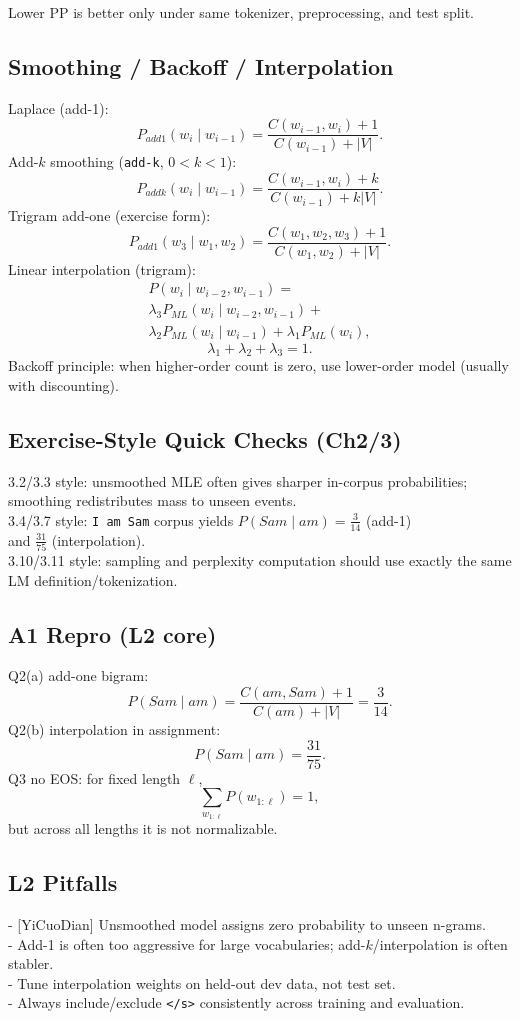 Lower PP is better only under same tokenizer, preprocessing, and test split.

\subsection*{Smoothing / Backoff / Interpolation}
Laplace (add-1):
\[
P_{add1}(w_i\mid w_{i-1})=
\frac{C(w_{i-1},w_i)+1}{C(w_{i-1})+|V|}.
\]
Add-$k$ smoothing (\texttt{add-k}, $0<k<1$):
\[
P_{addk}(w_i\mid w_{i-1})=
\frac{C(w_{i-1},w_i)+k}{C(w_{i-1})+k|V|}.
\]
Trigram add-one (exercise form):
\[
P_{add1}(w_3\mid w_1,w_2)=
\frac{C(w_1,w_2,w_3)+1}{C(w_1,w_2)+|V|}.
\]
Linear interpolation (trigram):
\[
\begin{array}{l}
P(w_i\mid w_{i-2},w_{i-1})=\\
\lambda_3P_{ML}(w_i\mid w_{i-2},w_{i-1})+\\
\lambda_2P_{ML}(w_i\mid w_{i-1})+\lambda_1P_{ML}(w_i),
\end{array}
\]
\[
\lambda_1+\lambda_2+\lambda_3=1.
\]
Backoff principle: when higher-order count is zero, use lower-order model (usually with discounting).

\subsection*{Exercise-Style Quick Checks (Ch2/3)}
3.2/3.3 style: unsmoothed MLE often gives sharper in-corpus probabilities;\\
smoothing redistributes mass to unseen events.\\
3.4/3.7 style: \texttt{I am Sam} corpus yields $P(Sam\mid am)=\frac{3}{14}$ (add-1)\\
and $\frac{31}{75}$ (interpolation).\\
3.10/3.11 style: sampling and perplexity computation should use exactly the same LM definition/tokenization.

\subsection*{A1 Repro (L2 core)}
Q2(a) add-one bigram:
\[
P(Sam\mid am)=\frac{C(am,Sam)+1}{C(am)+|V|}=\frac{3}{14}.
\]
Q2(b) interpolation in assignment:
\[
P(Sam\mid am)=\frac{31}{75}.
\]
Q3 no EOS: for fixed length $\ell$,
\[
\sum_{w_{1:\ell}}P(w_{1:\ell})=1,
\]
but across all lengths it is not normalizable.

\subsection*{L2 Pitfalls}
- [YiCuoDian] Unsmoothed model assigns zero probability to unseen n-grams.\\
- Add-1 is often too aggressive for large vocabularies; add-$k$/interpolation is often stabler.\\
- Tune interpolation weights on held-out dev data, not test set.\\
- Always include/exclude \texttt{</s>} consistently across training and evaluation.
